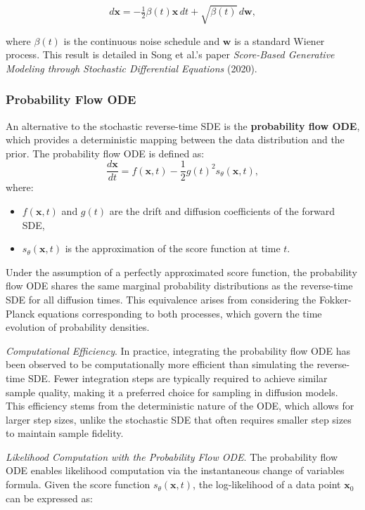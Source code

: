\[
d\mathbf{x} = -\tfrac{1}{2} \beta(t) \mathbf{x} \, dt + \sqrt{\beta(t)} \, d\mathbf{w},
\]

where \( \beta(t) \) is the continuous noise schedule and \( \mathbf{w} \) is a standard Wiener process. This result is detailed in Song et al.'s paper \textit{Score-Based Generative Modeling through Stochastic Differential Equations} (2020).

\subsubsection{Probability Flow ODE}

An alternative to the stochastic reverse-time SDE is the \textbf{probability flow ODE}, which provides a deterministic mapping between the data distribution and the prior. The probability flow ODE is defined as:
\[
\frac{d\mathbf{x}}{dt} = f(\mathbf{x}, t) - \frac{1}{2} g(t)^2 s_\theta(\mathbf{x}, t),
\]
where:
\begin{itemize}
    \item \( f(\mathbf{x}, t) \) and \( g(t) \) are the drift and diffusion coefficients of the forward SDE,
    \item \( s_\theta(\mathbf{x}, t) \) is the approximation of the score function at time $t$.
\end{itemize}

Under the assumption of a perfectly approximated score function, the probability flow ODE shares the same marginal probability distributions as the reverse-time SDE for all diffusion times. This equivalence arises from considering the Fokker-Planck equations corresponding to both processes, which govern the time evolution of probability densities.

\textit{Computational Efficiency}. In practice, integrating the probability flow ODE has been observed to be computationally more efficient than simulating the reverse-time SDE. Fewer integration steps are typically required to achieve similar sample quality, making it a preferred choice for sampling in diffusion models. This efficiency stems from the deterministic nature of the ODE, which allows for larger step sizes, unlike the stochastic SDE that often requires smaller step sizes to maintain sample fidelity.

\textit{Likelihood Computation with the Probability Flow ODE}. The probability flow ODE enables likelihood computation via the instantaneous change of variables formula. Given the score function \( s_\theta(\mathbf{x}, t) \), the log-likelihood of a data point \( \mathbf{x}_0 \) can be expressed as:

